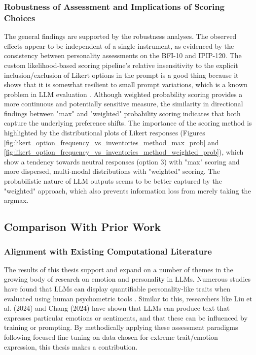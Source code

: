 \documentclass{DESSThesis}
\begin{document}
\subsubsection{Robustness of Assessment and Implications of Scoring Choices}
The general findings are supported by the robustness analyses. The observed effects appear to be independent of a single instrument, as evidenced by the consistency between personality assessments on the BFI-10 and IPIP-120. The custom likelihood-based scoring pipeline's relative insensitivity to the explicit inclusion/exclusion of Likert options in the prompt is a good thing because it shows that it is somewhat resilient to small prompt variations, which is a known problem in LLM evaluation \cite{gupta_self-assessment_2024, shu_you_2024}. Although weighted probability scoring provides a more continuous and potentially sensitive measure, the similarity in directional findings between "max" and "weighted" probability scoring indicates that both capture the underlying preference shifts. The importance of the scoring method is highlighted by the distributional plots of Likert responses (Figures \ref{fig:likert_option_frequency_vs_inventories_method_max_prob} and \ref{fig:likert_option_frequency_vs_inventories_method_weighted_prob}), which show a tendency towards neutral responses (option 3) with "max" scoring and more dispersed, multi-modal distributions with "weighted" scoring. The probabilistic nature of LLM outputs seems to be better captured by the "weighted" approach, which also prevents information loss from merely taking the argmax.

\subsection{Comparison With Prior Work}
\subsubsection{Alignment with Existing Computational Literature}
The results of this thesis support and expand on a number of themes in the growing body of research on emotion and personality in LLMs. Numerous studies have found that LLMs can display quantifiable personality-like traits when evaluated using human psychometric tools \cite{caron_manipulating_2023,safdari_personality_2023,sorokovikova_llms_2024,jiang_personallm_2024}. Similar to this, researchers like Liu et al. (2024) and Chang (2024) have shown that LLMs can produce text that expresses particular emotions or sentiments, and that these can be influenced by training or prompting. By methodically applying these assessment paradigms following focused fine-tuning on data chosen for extreme trait/emotion expression, this thesis makes a contribution.
\end{document}
